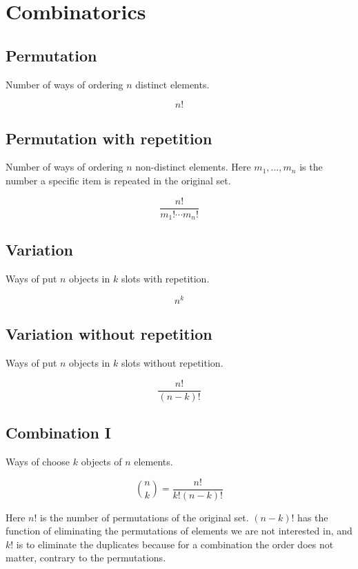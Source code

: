 \newpage
\section{Combinatorics}

\subsection{Permutation}

Number of ways of ordering \(n\) distinct elements.

\[
    n!
\]

\subsection{Permutation with repetition}

Number of ways of ordering \(n\) non-distinct elements. Here \(m_1, \dots, m_n\)
is the number a specific item is repeated in the original set.

\[
    \frac{n!}{m_1! \cdots m_n!}
\]

\subsection{Variation}

Ways of put \(n\) objects in \(k\) slots with repetition.

\[
    n^k
\]

\subsection{Variation without repetition}

Ways of put \(n\) objects in \(k\) slots without repetition.

\[
    \frac{n!}{(n -k)!}
\]

\subsection{Combination I}

Ways of choose \(k\) objects of \(n\) elements.

\[
    \binom{n}{k} = \frac{n!}{k!(n-k)!}
\]

Here \(n\)! is the number of permutations of the original set.
\((n-k)\)! has the function of eliminating the permutations of elements we are not interested in, and
\(k\)! is to eliminate the duplicates because for a combination the order does not matter, contrary to
the permutations.

